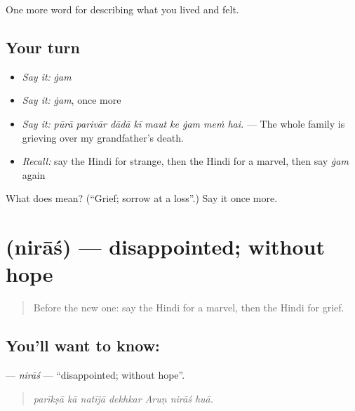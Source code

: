 \begin{grammarlens}[title={What you've built}]
One more word for describing what you lived and felt.
\end{grammarlens}

\subsection*{Your turn}
\begin{itemize}
\raggedright
  \item \emph{Say it:} \emph{ġam}
  \item \emph{Say it:} \emph{ġam}, once more
  \item \emph{Say it:} \emph{pūrā parivār dādā kī maut ke ġam meṁ hai.} — The whole family is grieving over my grandfather's death.
  \item \emph{Recall:} say the Hindi for strange, then the Hindi for a marvel, then say \emph{ġam} again
\end{itemize}

\begin{tcolorbox}[breakable,colback=teal!4,colframe=teal!35!black,title={Before you move on}]
What does  mean? (\textquotedblleft{}Grief; sorrow at a loss\textquotedblright{}.) Say it once more.
\end{tcolorbox}
\section[\texorpdfstring{\hi{निराश} (nirāś)}{निराश (nirāś)}]{ (nirāś) — disappointed; without hope}

\label{lesson:HI-C455-niras}



\begin{quote}
Before the new one: say the Hindi for a marvel, then the Hindi for grief.
\end{quote}

\subsection*{You'll want to know: }
\textbf{} — \emph{nirāś} — \textquotedblleft{}disappointed; without hope\textquotedblright{}.

\begin{quote}
      
\end{quote}

\begin{quote}
\emph{parīkṣā kā natījā dekhkar Aruṇ nirāś huā.}
\end{quote}

